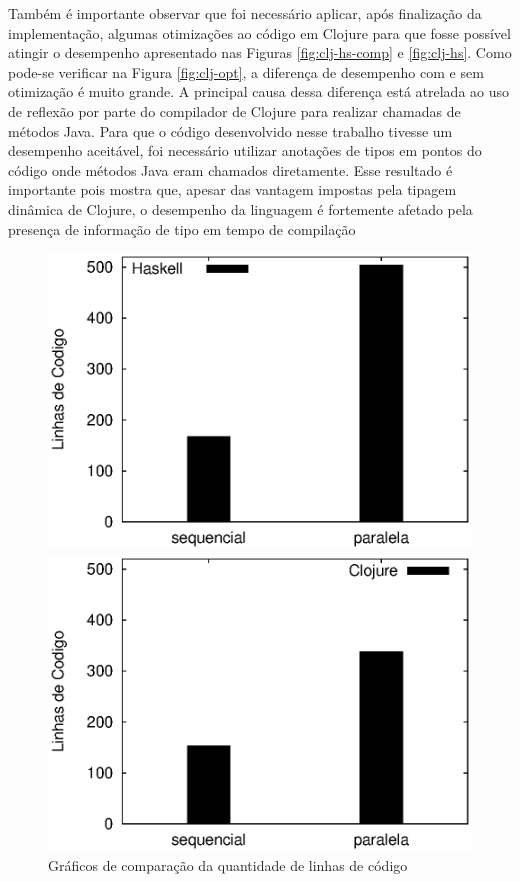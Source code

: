 Também é importante observar que foi necessário aplicar, após finalização da implementação, algumas otimizações ao código em Clojure para que fosse possível atingir o desempenho apresentado nas Figuras \ref{fig:clj-hs-comp} e \ref{fig:clj-hs}. Como pode-se verificar na Figura \ref{fig:clj-opt}, a diferença de desempenho com e sem otimização é muito grande. A principal causa dessa diferença está atrelada ao uso de reflexão por parte do compilador de Clojure para realizar chamadas de métodos Java. Para que o código desenvolvido nesse trabalho tivesse um desempenho aceitável, foi necessário utilizar anotações de tipos em pontos do código onde métodos Java eram chamados diretamente. Esse resultado é importante pois mostra que, apesar das vantagem impostas pela tipagem dinâmica de Clojure, o desempenho da linguagem é fortemente afetado pela presença de informação de tipo em tempo de compilação

\begin{figure}[!h]
 \begin{minipage}{0.5\textwidth}
  \centering
  \includegraphics[scale=0.63]{imagens/loc-haskell.eps}
 \end{minipage}
 \begin{minipage}{0.5\textwidth}
  \includegraphics[scale=0.63]{imagens/loc-clojure.eps}
 \end{minipage}
 \caption{Gráficos de comparação da quantidade de linhas de código}
 \label{fig:clj-hs-loc}
\end{figure}

